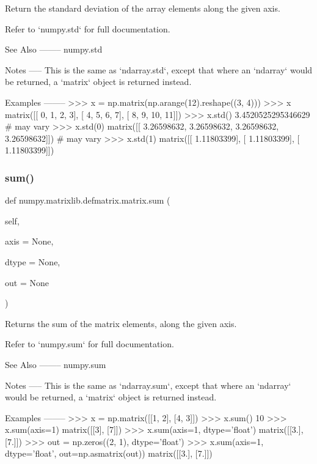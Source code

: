 \begin{DoxyVerb}Return the standard deviation of the array elements along the given axis.

Refer to `numpy.std` for full documentation.

See Also
--------
numpy.std

Notes
-----
This is the same as `ndarray.std`, except that where an `ndarray` would
be returned, a `matrix` object is returned instead.

Examples
--------
>>> x = np.matrix(np.arange(12).reshape((3, 4)))
>>> x
matrix([[ 0,  1,  2,  3],
[ 4,  5,  6,  7],
[ 8,  9, 10, 11]])
>>> x.std()
3.4520525295346629 # may vary
>>> x.std(0)
matrix([[ 3.26598632,  3.26598632,  3.26598632,  3.26598632]]) # may vary
>>> x.std(1)
matrix([[ 1.11803399],
[ 1.11803399],
[ 1.11803399]])\end{DoxyVerb}
 \mbox{\label{classnumpy_1_1matrixlib_1_1defmatrix_1_1matrix_a94a04383a1d739afc5123f76181abe7b}} 
\subsubsection{\texorpdfstring{sum()}{sum()}}
{\footnotesize\ttfamily def numpy.\+matrixlib.\+defmatrix.\+matrix.\+sum (\begin{DoxyParamCaption}\item[{}]{self,  }\item[{}]{axis = {\ttfamily None},  }\item[{}]{dtype = {\ttfamily None},  }\item[{}]{out = {\ttfamily None} }\end{DoxyParamCaption})}

\begin{DoxyVerb}Returns the sum of the matrix elements, along the given axis.

Refer to `numpy.sum` for full documentation.

See Also
--------
numpy.sum

Notes
-----
This is the same as `ndarray.sum`, except that where an `ndarray` would
be returned, a `matrix` object is returned instead.

Examples
--------
>>> x = np.matrix([[1, 2], [4, 3]])
>>> x.sum()
10
>>> x.sum(axis=1)
matrix([[3],
[7]])
>>> x.sum(axis=1, dtype='float')
matrix([[3.],
[7.]])
>>> out = np.zeros((2, 1), dtype='float')
>>> x.sum(axis=1, dtype='float', out=np.asmatrix(out))
matrix([[3.],
[7.]])\end{DoxyVerb}
 \mbox{\label{classnumpy_1_1matrixlib_1_1defmatrix_1_1matrix_a79e011e9fb401c2c1b985bee28bc28eb}} 
